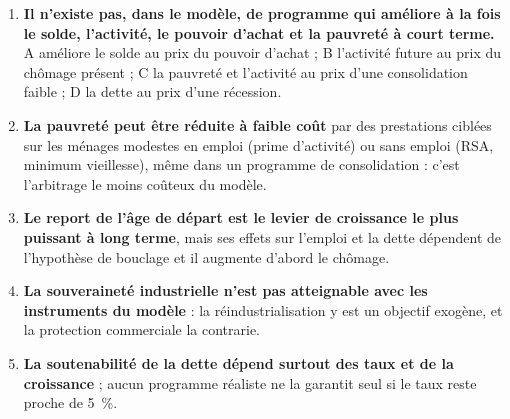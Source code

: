 \begin{enumerate}
\item \textbf{Il n'existe pas, dans le modèle, de programme qui améliore à la fois le solde, l'activité, le pouvoir
d'achat et la pauvreté à court terme.} A améliore le solde au prix du pouvoir d'achat ; B l'activité future au prix du
chômage présent ; C la pauvreté et l'activité au prix d'une consolidation faible ; D la dette au prix d'une récession.
\item \textbf{La pauvreté peut être réduite à faible coût} par des prestations ciblées sur les ménages modestes en emploi
(prime d'activité) ou sans emploi (RSA, minimum vieillesse), même dans un programme de consolidation : c'est l'arbitrage
le moins coûteux du modèle.
\item \textbf{Le report de l'âge de départ est le levier de croissance le plus puissant à long terme}, mais ses effets sur
l'emploi et la dette dépendent de l'hypothèse de bouclage et il augmente d'abord le chômage.
\item \textbf{La souveraineté industrielle n'est pas atteignable avec les instruments du modèle} : la réindustrialisation
y est un objectif exogène, et la protection commerciale la contrarie.
\item \textbf{La soutenabilité de la dette dépend surtout des taux et de la croissance} ; aucun programme réaliste ne la
garantit seul si le taux reste proche de 5~\%.
\end{enumerate}
